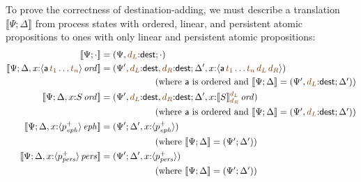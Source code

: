 

To prove the correctness of destination-adding, we must describe a 
translation $\llbracket \Psi; \Delta \rrbracket$ from process states
with ordered, linear, and persistent atomic propositions to ones
with only linear and persistent atomic propositions:
\begin{align*}
\llbracket \Psi; \cdot \rrbracket & = (\Psi, \lf{d_L}{:}{\sf dest}; \cdot) 
\\
\llbracket \Psi; \Delta, x{:}\istrue{\susp{{\sf a}\,\lf{t_1}\ldots \lf{t_n}}} \rrbracket 
& = (\Psi', \lf{d_L}{:}{\sf dest}, \lf{d_R}{:}{\sf dest}; 
     \Delta', x{:}\susp{{\sf a}\,\lf{t_1}\ldots \lf{t_n}\,\lf{d_L}\,\lf{d_R}})\\
& \qquad\qquad\qquad
  \mbox{(where $\sf a$ is ordered and
  $\llbracket \Psi; \Delta \rrbracket = (\Psi', \lf{d_L}{:}{\sf dest}; \Delta') $)}
\\
\llbracket \Psi; \Delta, x{:}\istrue{S} \rrbracket 
& = (\Psi', \lf{d_L}{:}{\sf dest}, \lf{d_R}{:}{\sf dest}; 
     \Delta', x{:}\istrue{\llbracket S \rrbracket^{\lf{d_L}}_{\lf{d_R}}})\\
& \qquad\qquad\qquad
  \mbox{(where $\sf a$ is ordered and
  $\llbracket \Psi; \Delta \rrbracket = (\Psi', \lf{d_L}{:}{\sf dest}; \Delta') $)}
\\
\llbracket \Psi; \Delta, x{:}\iseph{\susp{p^+_\meph}} \rrbracket 
& = (\Psi'; \Delta', x{:}\susp{p^+_\meph})
\\ &
 \qquad\qquad\qquad \mbox{(where
       $\llbracket \Psi; \Delta \rrbracket = (\Psi'; \Delta') $)}
\\
\llbracket \Psi; \Delta, x{:}\ispers{\susp{p^+_\mpers}} \rrbracket 
& = (\Psi'; \Delta', x{:}\susp{p^+_\mpers})
\\ &
  \qquad\qquad\qquad \mbox{(where 
       $\llbracket \Psi; \Delta \rrbracket = (\Psi'; \Delta') $)}
\end{align*}

